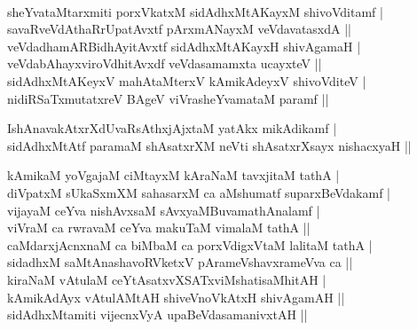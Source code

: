 \begin{entry}
\end{entry}

\begin{entry}
\gl{}
\end{entry}

\begin{entry}
\\
\begin{shl}
sheYvataMtarxmiti porxVkatxM sidAdhxMtAKayxM shivoVditamf |\\
savaRveVdAthaRrUpatAvxtf pArxmANayxM veVdavatasxdA ||\\
veVdadhamARBidhAyitAvxtf sidAdhxMtAKayxH shivAgamaH |\\
veVdabAhayxviroVdhitAvxdf veVdasamamxta ucayxteV ||\\
sidAdhxMtAKeyxV mahAtaMterxV kAmikAdeyxV shivoVditeV |\\
nidiRSaTxmutatxreV BAgeV viVrasheYvamataM paramf ||
\end{shl}
\begin{shl}
IshAnavakAtxrXdUvaRsAthxjAjxtaM yatAkx mikAdikamf |\\
sidAdhxMtAtf paramaM shAsatxrXM neVti shAsatxrXsayx nishacxyaH ||
\end{shl}
\begin{shl}
kAmikaM yoVgajaM ciMtayxM kAraNaM tavxjitaM tathA |\\
diVpatxM sUkaSxmXM sahasarxM ca aMshumatf suparxBeVdakamf |\\
vijayaM ceYva nishAvxsaM sAvxyaMBuvamathAnalamf |\\
viVraM ca rwravaM ceYva makuTaM vimalaM tathA ||\\
caMdarxjAcnxnaM ca biMbaM ca porxVdigxVtaM lalitaM tathA |\\
sidadhxM saMtAnashavoRVketxV pArameVshavxrameVva ca ||\\
kiraNaM vAtulaM ceYtAsatxvXSATxviMshatisaMhitAH |\\
kAmikAdAyx vAtulAMtAH shiveVnoVkAtxH shivAgamAH ||\\
sidAdhxMtamiti vijecnxVyA upaBeVdasamanivxtAH ||
\end{shl}


\end{entry}
